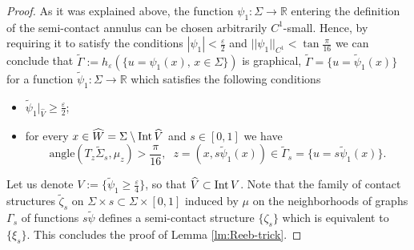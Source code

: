 \documentclass[12pt]{paper}
\theoremstyle{plain}
\theoremstyle{definition}
\newcommand{\wt}{\widetilde}
\newcommand{\wh}{\widehat}
\newcommand{\eps}{\varepsilon}
\newcommand{\R}{{\mathbb{R}}}
\newcommand{\Int}{{\rm Int\,}} %
\numberwithin{figure}{section}
\begin{document}
\begin{proof}
As it was explained above,  the function $\psi_1\colon\Sigma\to\R$  entering the definition of  the semi-contact annulus can be chosen arbitrarily $C^1$-small. Hence, by requiring it to satisfy the conditions
$|\psi_1|< \frac\eps2$ and $||\psi_1||_{C^1}<\tan\frac\pi{16}$ we can conclude that 
 $\wt\Gamma  :=h_\eps(\{u= \psi_1(x),\,x\in\Sigma\})$ is graphical, $\wt\Gamma  =\{u= \wt\psi_1 (x)\}$ for a   function $\wt\psi_1:\Sigma\to\R$ which satisfies the following conditions
\begin{itemize}
 \item $\wt\psi_1|_{\wh V}\geq\frac\eps2$;
 \item for every $x\in \wh W=\Sigma\setminus\Int \wh V$  and $s\in[0,1]$ we have
$${\mathrm{angle}}(T_{z}\wt\Sigma_s,\mu_z)>\frac\pi{16},\;\;z=(x,s\wt\psi_1(x))\in\wt\Gamma_s=  \{u= s\wt\psi_1 (x)\}.$$  \end{itemize}
Let us denote   $  V:=\{\wt\psi_1 \geq\frac\eps4\}$, so that $\wh V\subset\Int V$. 
Note that the family  of contact structures $\wt\zeta_s$  on $\Sigma\times s\subset\Sigma\times[0,1]$ induced by $\mu$ on the neighborhoods of graphs $\Gamma_s$ of functions $  s\wt\psi$ defines a semi-contact structure $\{\zeta_s\}$ which is 
equivalent to $\{\xi_s\}$. This concludes the proof of Lemma \ref{lm:Reeb-trick}.
\end{proof}
\end{document}

